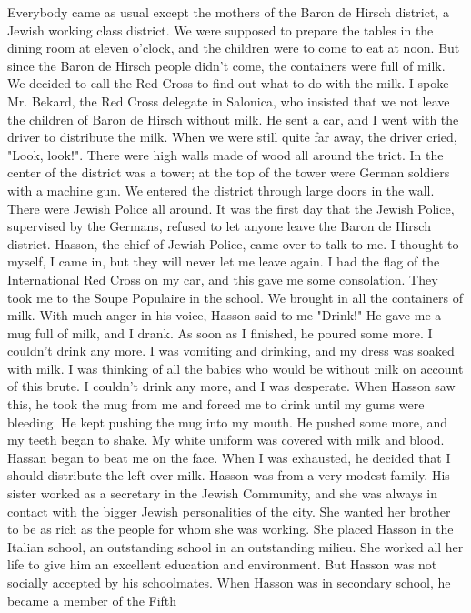 Everybody came as usual except the mothers of 
the Baron de Hirsch district, a Jewish working class district.
We were 
supposed to prepare the tables in the dining room at eleven o'clock, 
and the children were to come to eat at noon.
But since the Baron de 
Hirsch people didn't come, the containers were full of milk.
We decided 
to call the Red Cross to find out what to do with the milk.
I spoke 
Mr.
Bekard, the Red Cross delegate in Salonica, who insisted that we 
not leave the children of Baron de Hirsch without milk.
He sent a car, 
and I went with the driver to distribute the milk.
When we were still quite far away, the driver cried, 
"Look, look!".
There were high walls made of wood all around the 
trict.
In the center of the district was a tower; at the top of the 
tower were German soldiers with a machine gun.
We entered the district through large doors in the wall.
There were Jewish Police all around.
It was the first day that the Jewish Police, supervised by the Germans, refused to let anyone leave the Baron de Hirsch district.
Hasson, the chief of Jewish Police, came over to talk to me.
I thought 
to myself, I came in, but they will never let me leave again.
I had the 
flag of the International Red Cross on my car, and this gave me some consolation.
They took me to the Soupe Populaire in the school.
We brought in 
all the containers of milk.
With much anger in his voice, Hasson 
said to me "Drink!"
He gave me a mug full of milk, and I drank.
As 
soon as I finished, he poured some more.
I couldn't drink any more.
I 
was vomiting and drinking, and my dress was soaked with milk.
I was 
thinking of all the babies who would be without milk on account of this 
brute.
I couldn't drink any more, and I was desperate.
When Hasson saw 
this, he took the mug from me and forced me to drink until my gums were 
bleeding.
He kept pushing the mug into my mouth.
He pushed some more, 
and my teeth began to shake.
My white uniform was covered with milk and 
blood.
Hassan began to beat me on the face.
When I was exhausted, he 
decided that I should distribute the left over milk.
Hasson was from a very modest family.
His sister worked as a secretary in the Jewish Community, and she was always in contact with the 
bigger Jewish personalities of the city.
She wanted her brother to be 
as rich as the people for whom she was working.
She placed Hasson in 
the Italian school, an outstanding school in an outstanding milieu.
She 
worked all her life to give him an excellent education and environment.
But Hasson was not socially accepted by his schoolmates.
When Hasson was in secondary school, he became a member of the Fifth 
